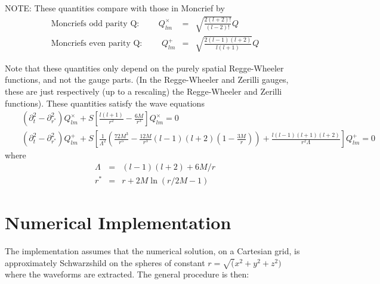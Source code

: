 \documentclass{article}
\begin{document}
\noindent
NOTE: These quantities compare with those in Moncrief \cite{moncrief74} by
\begin{eqnarray*}
\mbox{Moncriefs odd parity Q: }\qquad Q^\times_{lm} &=&
 \sqrt{\frac{2(l+2)!}{(l-2)!}}Q
 \\
\mbox{Moncriefs even parity Q: } \qquad Q^+_{lm} &=&
 \sqrt{\frac{2(l-1)(l+2)}{l(l+1)}}Q
\end{eqnarray*}

Note that these quantities only depend on the purely spatial 
Regge-Wheeler functions, and not the gauge parts. (In the Regge-Wheeler 
and Zerilli gauges, these are just respectively (up to a rescaling)
 the Regge-Wheeler 
and Zerilli functions).
These quantities satisfy the wave equations
\begin{eqnarray*}
  &&(\partial^2_t-\partial^2_{r^*})Q^\times_{lm}+S\left[\frac{l(l+1)}{r^2}-\frac{6M}{r^3}
  \right]Q^{\times}_{lm}  =  0 
  \\
  &&(\partial^2_t-\partial^2_{r^*})Q^+_{lm}+S\left[
    \frac{1}{\Lambda^2}\left(\frac{72M^3}{r^5}-\frac{12M}{r^3}(l-1)(l+2)\left(1-\frac{3M}{r}\right)
    \right)+\frac{l(l-1)(l+1)(l+2)}{r^2\Lambda}\right]Q^+_{lm}=0
\end{eqnarray*}
where
\begin{eqnarray*}
  \Lambda &=& (l-1)(l+2)+6M/r \\
  r^*     &=& r+2M\ln(r/2M-1)
\end{eqnarray*}
 



\section{Numerical Implementation}

The implementation assumes that the numerical solution, on a Cartesian
grid, is approximately Schwarzshild on the spheres of constant
$r=\sqrt(x^2+y^2+z^2)$ where the waveforms are extracted. The general
procedure is then:
\end{document}
